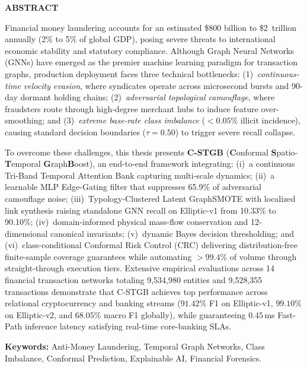 \begin{center}
   \vspace*{0.3cm}
   {\Large\textbf{ABSTRACT}}\\[0.5cm]
\end{center}

Financial money laundering accounts for an estimated \$800 billion to \$2~\mbox{trillion} annually (2\% to 5\% of global GDP), posing severe threats to international economic stability and statutory compliance. Although Graph Neural Networks (GNNs) have emerged as the premier machine learning paradigm for transaction graphs, production deployment faces three technical bottlenecks: (1)~\textit{\mbox{continuous-time} velocity evasion}, where syndicates operate across microsecond bursts and \mbox{90-day} dormant holding chains; (2)~\textit{adversarial topological camouflage}, where fraudsters route through high-degree merchant hubs to induce feature over-smoothing; and (3)~\textit{extreme base-rate class imbalance} ($<0.05\%$ illicit incidence), causing standard decision boundaries ($\tau = 0.50$) to trigger severe recall collapse.

To overcome these challenges, this thesis presents \textbf{C-STGB} (\textbf{C}onformal \textbf{S}patio-\textbf{T}emporal \textbf{G}raph\textbf{B}oost), an end-to-end framework integrating: (i)~a continuous Tri-Band Temporal Attention Bank capturing multi-scale dynamics; (ii)~a learnable MLP Edge-Gating filter that suppresses 65.9\% of adversarial camouflage noise; (iii)~Typology-Clustered Latent GraphSMOTE with localized link synthesis raising standalone GNN recall on Elliptic-v1 from 10.33\% to 90.10\%; (iv)~domain-informed physical mass-flow conservation and 12-dimensional canonical invariants; (v)~dynamic Bayes decision thresholding; and (vi)~class-conditional Conformal Risk Control (CRC) delivering distribution-free finite-sample coverage guarantees while automating $>99.4\%$ of volume through straight-through execution tiers. Extensive empirical evaluations across 14 financial transaction networks totaling 9,534,980 entities and 9,528,355 transactions demonstrate that C-STGB achieves top performance across relational cryptocurrency and banking streams ($91.42\%$ F1 on Elliptic-v1, $99.10\%$ on Elliptic-v2, and $68.05\%$ macro F1 globally), while guaranteeing $0.45$\,ms Fast-Path inference latency satisfying real-time core-banking SLAs.

\vspace{0.6cm}
\noindent\textbf{Keywords:} Anti-Money Laundering, Temporal Graph Networks, Class Imbalance, Conformal Prediction, Explainable AI, Financial Forensics.
\clearpage
